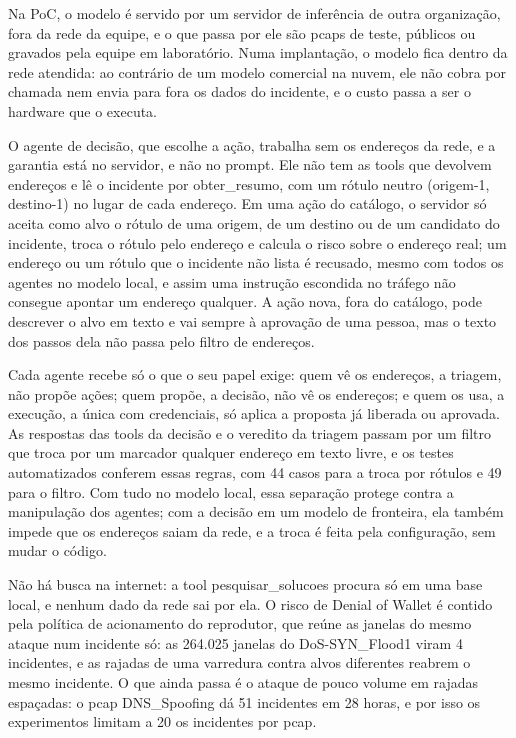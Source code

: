 Na PoC, o modelo é servido por um servidor de inferência de outra organização, fora da rede da equipe, e o que passa por ele são pcaps de teste, públicos ou gravados pela equipe em laboratório. Numa implantação, o modelo fica dentro da rede atendida: ao contrário de um modelo comercial na nuvem, ele não cobra por chamada nem envia para fora os dados do incidente, e o custo passa a ser o hardware que o executa.

O agente de decisão, que escolhe a ação, trabalha sem os endereços da rede, e a garantia está no servidor, e não no prompt. Ele não tem as tools que devolvem endereços e lê o incidente por obter\_resumo, com um rótulo neutro (origem-1, destino-1) no lugar de cada endereço. Em uma ação do catálogo, o servidor só aceita como alvo o rótulo de uma origem, de um destino ou de um candidato do incidente, troca o rótulo pelo endereço e calcula o risco sobre o endereço real; um endereço ou um rótulo que o incidente não lista é recusado, mesmo com todos os agentes no modelo local, e assim uma instrução escondida no tráfego não consegue apontar um endereço qualquer. A ação nova, fora do catálogo, pode descrever o alvo em texto e vai sempre à aprovação de uma pessoa, mas o texto dos passos dela não passa pelo filtro de endereços.

Cada agente recebe só o que o seu papel exige: quem vê os endereços, a triagem, não propõe ações; quem propõe, a decisão, não vê os endereços; e quem os usa, a execução, a única com credenciais, só aplica a proposta já liberada ou aprovada. As respostas das tools da decisão e o veredito da triagem passam por um filtro que troca por um marcador qualquer endereço em texto livre, e os testes automatizados conferem essas regras, com 44 casos para a troca por rótulos e 49 para o filtro. Com tudo no modelo local, essa separação protege contra a manipulação dos agentes; com a decisão em um modelo de fronteira, ela também impede que os endereços saiam da rede, e a troca é feita pela configuração, sem mudar o código.

Não há busca na internet: a tool pesquisar\_solucoes procura só em uma base local, e nenhum dado da rede sai por ela. O risco de Denial of Wallet é contido pela política de acionamento do reprodutor, que reúne as janelas do mesmo ataque num incidente só: as 264.025 janelas do DoS-SYN\_Flood1 viram 4 incidentes, e as rajadas de uma varredura contra alvos diferentes reabrem o mesmo incidente. O que ainda passa é o ataque de pouco volume em rajadas espaçadas: o pcap DNS\_Spoofing dá 51 incidentes em 28 horas, e por isso os experimentos limitam a 20 os incidentes por pcap.

